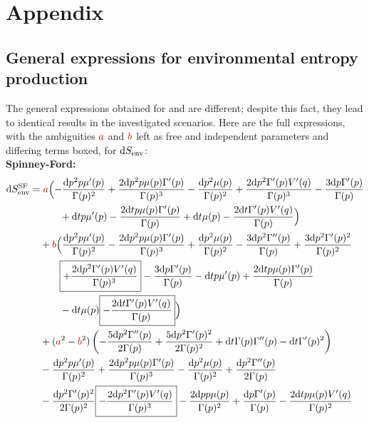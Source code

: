 \chapter{Appendix}

\renewcommand{\thechapter}{\Alph{chapter}.}
\renewcommand{\thesection}{\Alph{chapter}.\arabic{section}}
\renewcommand{\thesubsection}{\Alph{chapter}.\arabic{section}.\arabic{subsection}}
\renewcommand{\theequation}{\Alph{chapter}.\arabic{equation}}

\section{General expressions for environmental entropy production}
\label{sec:general SEnv expressions}

The general expressions obtained for \SF and \HF are different; despite this fact, they lead to identical results in the investigated scenarios. Here are the full expressions, with the ambiguities \({\color{red}a}\) and \({\color{red}b}\) left as free and independent parameters and differing terms boxed, for \(\mathrm{d}S_\text{env}\):
\\
\textbf{Spinney-Ford:}
\begin{equation*}\begin{split}
	\d\SEnv^\SF &= 
	{\color{red}a} \Bigl(-\frac{\d p^2 p \mu '(p)}{\Gamma (p)^2}+\frac{2 \d p^2 p \mu (p) \Gamma '(p)}{\Gamma (p)^3}-\frac{\d p^2 \mu (p)}{\Gamma (p)^2}+\frac{2 \d p^2 \Gamma '(p) V'(q)}{\Gamma (p)^3}-\frac{3 \d p \Gamma '(p)}{\Gamma (p)}
		\\&\qquad\quad
		+ \d t p \mu '(p)-\frac{2 \d t p \mu (p) \Gamma '(p)}{\Gamma (p)}+\d t \mu (p)-\frac{2 \d t \Gamma '(p) V'(q)}{\Gamma (p)}\Bigr)
	\\&\quad
	+{\color{red}b} \Bigl(\frac{\d p^2 p \mu '(p)}{\Gamma (p)^2}-\frac{2 \d p^2 p \mu (p) \Gamma '(p)}{\Gamma (p)^3}+\frac{\d p^2 \mu (p)}{\Gamma (p)^2}-\frac{3 \d p^2 \Gamma ''(p)}{\Gamma (p)} +\frac{3 \d p^2 \Gamma '(p)^2}{\Gamma (p)^2}
		\\&\qquad\quad
		\boxed{+\frac{2 \d p^2 \Gamma '(p) V'(q)}{\Gamma (p)^3}}-\frac{3 \d p \Gamma '(p)}{\Gamma (p)}-\d t p \mu '(p)+\frac{2 \d t p \mu (p) \Gamma '(p)}{\Gamma (p)}
		\\&\qquad\quad
		-\d t \mu (p)\boxed{-\frac{2 \d t \Gamma '(p) V'(q)}{\Gamma (p)}}\Bigr)
	\\&\quad
	+({\color{red}a}^2 - {\color{red}b}^2) \left(-\frac{5 \d p^2 \Gamma ''(p)}{2 \Gamma (p)}+\frac{5 \d p^2 \Gamma '(p)^2}{2 \Gamma (p)^2}+\d t \Gamma (p) \Gamma ''(p)-\d t \Gamma '(p)^2\right)
	\\&\quad
	-\frac{\d p^2 p \mu '(p)}{\Gamma (p)^2}+\frac{2 \d p^2 p \mu (p) \Gamma '(p)}{\Gamma (p)^3}-\frac{\d p^2 \mu (p)}{\Gamma (p)^2}+\frac{\d p^2 \Gamma ''(p)}{2 \Gamma (p)}
	\\&\quad
	-\frac{\d p^2 \Gamma '(p)^2}{2 \Gamma (p)^2}\boxed{-\frac{2 \d p^2 \Gamma '(p) V'(q)}{\Gamma (p)^3}}-\frac{2 \d p p \mu (p)}{\Gamma (p)^2}+\frac{\d p \Gamma '(p)}{\Gamma (p)}-\frac{2 \d t p \mu (p) V'(q)}{\Gamma (p)^2}
\end{split}\end{equation*}
